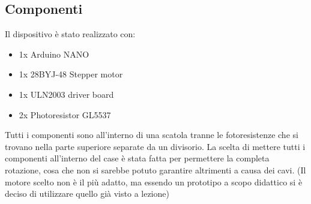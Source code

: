 \documentclass[12pt,oneside,a4paper]{article}
\begin{document}
\subsection{Componenti}
Il dispositivo è stato realizzato con:
\begin{itemize}
    \item 1x Arduino NANO
    \item 1x 28BYJ-48 Stepper motor
    \item 1x ULN2003 driver board
    \item 2x Photoresistor GL5537
\end{itemize}
Tutti i componenti sono all'interno di una scatola tranne le fotoresistenze che si trovano nella parte superiore separate da un divisorio. La scelta di mettere tutti i componenti all'interno del case è stata fatta per permettere la completa rotazione, cosa che non si sarebbe potuto garantire altrimenti a causa dei cavi. (Il motore scelto non è il più adatto, ma essendo un prototipo a scopo didattico si è deciso di utilizzare quello già visto a lezione)

\end{document}
